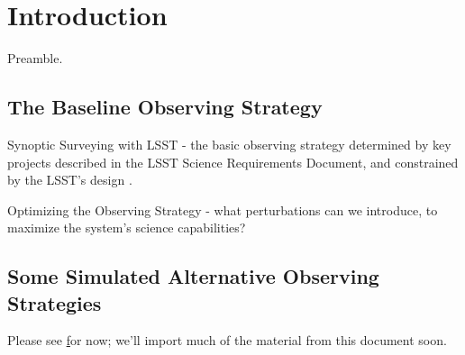 
\chapter[Introduction]{Introduction}
\label{chp:intro}


Preamble.

\section{The Baseline Observing Strategy}

Synoptic Surveying with LSST - the basic observing strategy determined
by key projects described in the LSST Science Requirements Document,
and constrained by the LSST's design \citep{IvezicEtal2008}.

Optimizing the Observing Strategy - what perturbations can we
introduce, to maximize the system's science capabilities?


\section{Some Simulated Alternative Observing Strategies}


Please see
\href{http://www.astro.washington.edu/users/ivezic/lsst/cadexp2.pdf}
for now; we'll import much of the material from this document soon.
